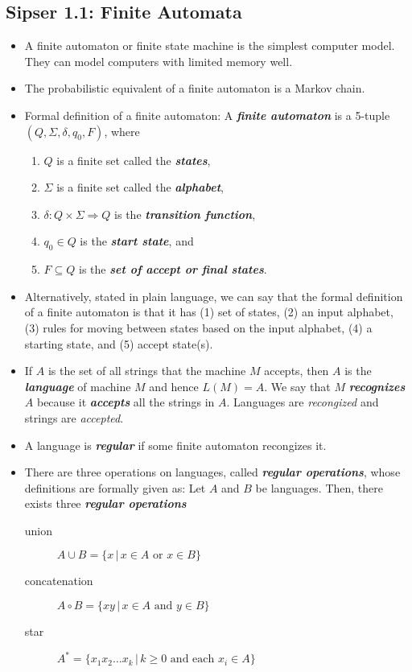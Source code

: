 \documentclass{article}
\begin{document}
\subsection{Sipser 1.1: Finite Automata}
\begin{itemize}
    \item A finite automaton or finite state machine is the simplest computer model. They can model computers with limited memory well.
    \item The probabilistic equivalent of a finite automaton is a Markov chain.
    \item Formal definition of a finite automaton: A \textbf{\textit{finite automaton}} is a 5-tuple $(Q,\Sigma,\delta,q_0,F)$, where 
    \begin{enumerate}
        \item $Q$ is a finite set called the \textbf{\textit{states}},
        \item $\Sigma$ is a finite set called the \textbf{\textit{alphabet}},
        \item $\delta: Q \times \Sigma \Rightarrow Q$ is the \textbf{\textit{transition function}},
        \item $q_0 \in Q$ is the \textbf{\textit{start state}}, and
        \item $F \subseteq Q$ is the \textbf{\textit{set of accept or final states}}.
    \end{enumerate}
    \item Alternatively, stated in plain language, we can say that the formal definition of a finite automaton is that it has (1) set of states, (2) an input alphabet, (3) rules for moving between states based on the input alphabet, (4) a starting state, and (5) accept state(s).
    \item If $A$ is the set of all strings that the machine $M$ accepts, then $A$ is the \textbf{\textit{language}} of machine $M$ and hence $L(M) = A$. We say that $M$ \textbf{\textit{recognizes}} $A$ because it \textbf{\textit{accepts}} all the strings in $A$. Languages are \textit{recongized} and strings are \textit{accepted}.
    \item A language is \textbf{\textit{regular}} if some finite automaton recongizes it.
    \item There are three operations on languages, called \textbf{\textit{regular operations}}, whose definitions are formally given as: Let $A$ and $B$ be languages. Then, there exists three \textbf{\textit{regular operations}}
    \begin{description}
        \item [union] {$A \cup B = \{x \,|\, x \in A \textrm{ or } x \in B\}$}
        \item [concatenation] {$A \circ B = \{xy \,|\, x \in A \textrm{ and } y \in B\}$}
        \item [star] {$A^* = \{x_1x_2\dots x_k \,|\, k \geq 0 \textrm{ and each } x_i \in A\}$}
    \end{description}
\end{itemize}
\end{document}
